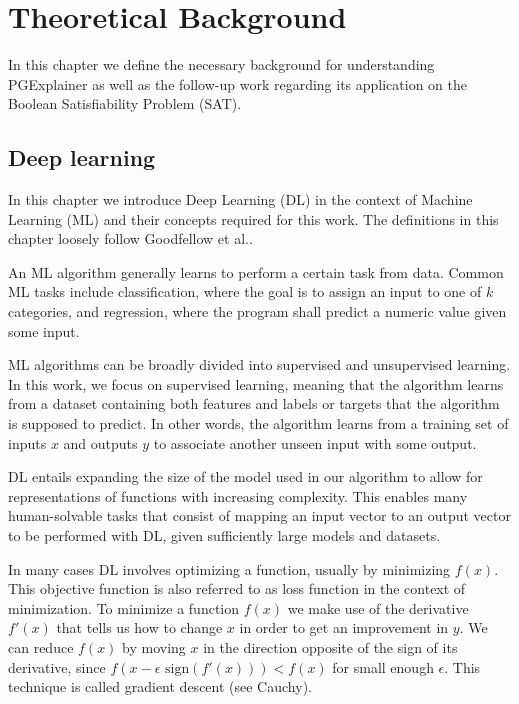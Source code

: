 \chapter{Theoretical Background}
\label{ch:Background}
In this chapter we define the necessary background for understanding PGExplainer as well as the follow-up work regarding its application on the Boolean Satisfiability Problem (SAT).

\section{Deep learning}
In this chapter we introduce Deep Learning (DL) in the context of Machine Learning (ML) and their concepts required for this work. The definitions in this chapter loosely follow Goodfellow et al.\cite{Goodfellow-et-al-2016}.

An ML algorithm generally learns to perform a certain task from data. Common ML tasks include classification, where the goal is to assign an input to one of $k$ categories, and regression, where the program shall predict a numeric value given some input. 

ML algorithms can be broadly divided into supervised and unsupervised learning. In this work, we focus on supervised learning, meaning that the algorithm learns from a dataset containing both features and labels or targets that the algorithm is supposed to predict. In other words, the algorithm learns from a training set of inputs $x$ and outputs $y$ to associate another unseen input with some output.


DL entails expanding the size of the model used in our algorithm to allow for representations of functions with increasing complexity. This enables many human-solvable tasks that consist of mapping an input vector to an output vector to be performed with DL, given sufficiently large models and datasets.

In many cases DL involves optimizing a function, usually by minimizing $f(x)$. This objective function is also referred to as loss function in the context of minimization. %
To minimize a function $f(x)$ we make use of the derivative $f'(x)$ that tells us how to change $x$ in order to get an improvement in $y$. We can reduce $f(x)$ by moving $x$ in the direction opposite of the sign of its derivative, since $f(x-\epsilon \text{ sign}(f'(x))) < f(x)$ for small enough $\epsilon$. This technique is called gradient descent (see Cauchy\cite{cauchy1847methode}).

